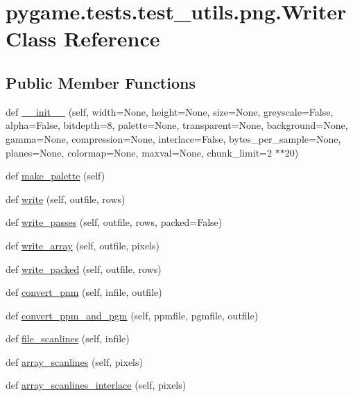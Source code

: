 \hypertarget{classpygame_1_1tests_1_1test__utils_1_1png_1_1_writer}{}\section{pygame.\+tests.\+test\+\_\+utils.\+png.\+Writer Class Reference}
\label{classpygame_1_1tests_1_1test__utils_1_1png_1_1_writer}
\subsection*{Public Member Functions}
\begin{DoxyCompactItemize}
\item 
def \hyperlink{classpygame_1_1tests_1_1test__utils_1_1png_1_1_writer_a9716e895bd87428666ac22f3326d62e5}{\+\_\+\+\_\+init\+\_\+\+\_\+} (self, width=None, height=None, size=None, greyscale=False, alpha=False, bitdepth=8, palette=None, transparent=None, background=None, gamma=None, compression=None, interlace=False, bytes\+\_\+per\+\_\+sample=None, planes=None, colormap=None, maxval=None, chunk\+\_\+limit=2 $\ast$$\ast$20)
\item 
def \hyperlink{classpygame_1_1tests_1_1test__utils_1_1png_1_1_writer_ade595d749a6b9d15af372b94169aa700}{make\+\_\+palette} (self)
\item 
def \hyperlink{classpygame_1_1tests_1_1test__utils_1_1png_1_1_writer_a30e64f6a5a3a197b27fa97896034adcb}{write} (self, outfile, rows)
\item 
def \hyperlink{classpygame_1_1tests_1_1test__utils_1_1png_1_1_writer_a1579d47dbdeb9352ecf83bb93b3a55dc}{write\+\_\+passes} (self, outfile, rows, packed=False)
\item 
def \hyperlink{classpygame_1_1tests_1_1test__utils_1_1png_1_1_writer_a537d59d4940e254553bc116271ef6cae}{write\+\_\+array} (self, outfile, pixels)
\item 
def \hyperlink{classpygame_1_1tests_1_1test__utils_1_1png_1_1_writer_ad24e0c033a1734f6da5560702b639429}{write\+\_\+packed} (self, outfile, rows)
\item 
def \hyperlink{classpygame_1_1tests_1_1test__utils_1_1png_1_1_writer_a14ce6ad7dc03b7f740da76c9e6eaa172}{convert\+\_\+pnm} (self, infile, outfile)
\item 
def \hyperlink{classpygame_1_1tests_1_1test__utils_1_1png_1_1_writer_a6fb7cb85c741d8555c41e60357f2d6de}{convert\+\_\+ppm\+\_\+and\+\_\+pgm} (self, ppmfile, pgmfile, outfile)
\item 
def \hyperlink{classpygame_1_1tests_1_1test__utils_1_1png_1_1_writer_a56892ba1b39c4d92709a64f3dda53e3d}{file\+\_\+scanlines} (self, infile)
\item 
def \hyperlink{classpygame_1_1tests_1_1test__utils_1_1png_1_1_writer_a1078bc7301a7d4f0fd381c1715e99253}{array\+\_\+scanlines} (self, pixels)
\item 
def \hyperlink{classpygame_1_1tests_1_1test__utils_1_1png_1_1_writer_a65f9f328d6472d2d1ef9ff812a19a840}{array\+\_\+scanlines\+\_\+interlace} (self, pixels)
\end{DoxyCompactItemize}

